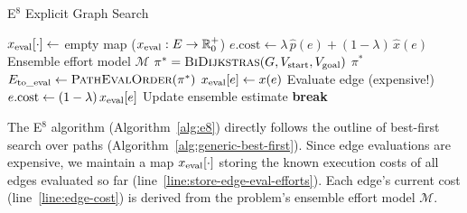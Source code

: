 \begin{algorithm}[t]
\caption{E$^8$ Explicit Graph Search}
\label{alg:e8}
\begin{algorithmic}[1]
   \State $x_{\mbox{\scriptsize eval}}[\cdot] \leftarrow$ empty map
      ($x_{\mbox{\scriptsize eval}} : E \rightarrow \mathbb{R}_0^+$)
      \label{line:store-edge-eval-efforts}
      \State $e.{\mbox{cost}} \leftarrow
         \lambda \, \hat{p}(e) + (1 - \lambda) \, \hat{x}(e)$
         \Comment Ensemble effort model $\mathcal{M}$
         \label{line:edge-cost}
   \EndFor
   \Loop
         \label{line:best-first-start}
      \State $\pi^* = \mbox{\sc BiDijkstras}(G,
         V_{\mbox{\scriptsize start}}, V_{\mbox{\scriptsize goal}})$
         \label{line:e8-select-optimistic-path}
         \State \Return $\pi^*$
            \label{line:return-done}
      \EndIf
      \State $E_{\mbox{\scriptsize to\_eval}} \leftarrow
         \mbox{\sc PathEvalOrder}(\pi^*)$
         \label{line:path-eval-order}
         \State $x_{\mbox{\scriptsize eval}}[e] \leftarrow x(e)$
            \Comment Evaluate edge (expensive!)
            \label{line:evaulate-edge}
         \State $e.{\mbox{cost}} \leftarrow
            (1 - \lambda) \, x_{\mbox{\scriptsize eval}}[e]$
            \Comment Update ensemble estimate
            \label{line:update-estimate}
            \label{line:exec-cost-check}
            \State \textbf{break}
               \label{line:eval-break}
         \EndIf
      \EndFor
   \EndLoop
      \label{line:best-first-end}
   \EndProcedure
\end{algorithmic}
\end{algorithm}

The E$^8$ algorithm (Algorithm~\ref{alg:e8})
directly follows the outline
of best-first search over paths
(Algorithm~\ref{alg:generic-best-first}).
Since edge evaluations are expensive,
we maintain a map $x_{\mbox{\scriptsize eval}}[\cdot]$
storing the known execution costs of all edges evaluated so far
(line~\ref{line:store-edge-eval-efforts}).
Each edge's current cost (line~\ref{line:edge-cost})
is derived from the problem's ensemble effort model $\mathcal{M}$.

